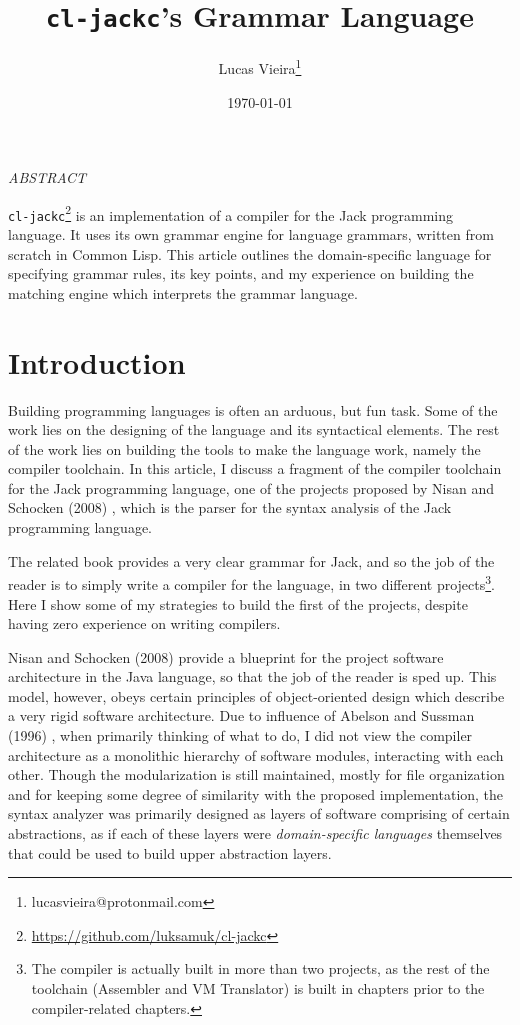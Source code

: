 \documentclass[a4paper,11pt,oneside]{article}
\author{Lucas Vieira\thanks{lucasvieira@protonmail.com}}
\date{\today}
\title{\texttt{cl-jackc}'s Grammar Language}
\begin{document}
\maketitle
\begin{center}
\emph{ABSTRACT}
\end{center}

\par\noindent
\texttt{cl-jackc}\footnote{\url{https://github.com/luksamuk/cl-jackc}} is an implementation of a compiler for the Jack
programming language. It uses its own grammar engine for language
grammars, written from scratch in Common Lisp. This article outlines
the domain-specific language for specifying grammar rules, its key
points, and my experience on building the matching engine which
interprets the grammar language.


\section{Introduction}
\label{sec:org59b5bc0}

Building programming languages is often an arduous, but fun task. Some
of the work lies on the designing of the language and its syntactical
elements. The rest of the work lies on building the tools
to make the language work, namely the compiler toolchain. In this
article, I discuss a fragment of the compiler toolchain for the Jack
programming language, one of the projects proposed by Nisan and
Schocken (2008) \cite{nand2tetris}, which is the parser for the syntax
analysis of the Jack programming language.

The related book provides a very clear grammar for Jack, and so the
job of the reader is to simply write a compiler for the language, in
two different projects\footnote{The compiler is actually built in more than two projects, as
the rest of the toolchain (Assembler and VM Translator) is built in
chapters prior to the compiler-related chapters.}. Here I show some of my strategies to
build the first of the projects, despite having zero experience on
writing compilers.

Nisan and Schocken (2008) \cite{nand2tetris} provide a blueprint for the
project software architecture in the Java language, so that the job of
the reader is sped up. This model, however, obeys certain principles
of object-oriented design which describe a very rigid software
architecture. Due to influence of Abelson and Sussman (1996)
\cite{sicp}, when primarily thinking of what to do, I did not view the
compiler architecture as a monolithic hierarchy of software modules,
interacting with each other. Though the modularization is still
maintained, mostly for file organization and for keeping some degree
of similarity with the proposed implementation, the syntax analyzer
was primarily designed as layers of software comprising of certain
abstractions, as if each of these layers were \emph{domain-specific
languages} themselves that could be used to build upper abstraction
layers.
\end{document}
